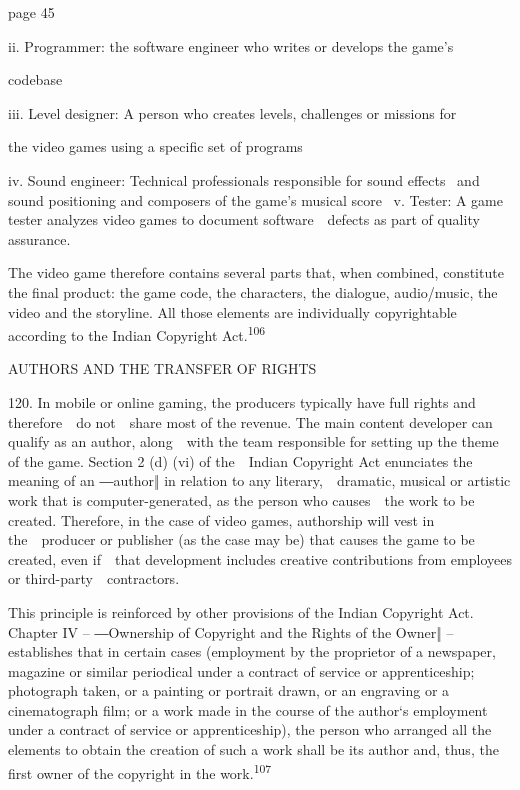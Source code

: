 \documentclass[
]{article}
\begin{document}
{page 45}

{ii. }{Programmer: the software engineer who writes or develops the
g}{ame's}

{codebase}

{iii. }{Level designer: A person who creates levels, challenges or
missions for}

{the video games using a specific set of programs}

{iv. }{Sound engineer: Technical professionals responsible for sound
effects }{~and sound positioning and composers of the game's }{musical
score }{~v. }{Tester: A game tester analyzes video games to document
software~~defects as part of quality assurance.}

{The video game therefore contains several parts that, when combined,
constitute the final product: the game code, the characters, the
dialogue, audio/music, the video and the storyline. All those elements
are individually copyrightable according to the Indian }{Copyright
Act}{.}\textsuperscript{{106}}

{AUTHORS AND THE TRANSFER OF RIGHTS}

{120. }{In mobile or online gaming, the producers typically have full
rights and therefore~~do not~~share most of the revenue. The main
content developer can qualify as an author, along~~with the team
responsible for setting up the theme of the game. Section 2 (d) (vi) of
the~~Indian }{Copyright Act }{enunciates the meaning of an ―}{author}{‖
in }{relation to any literary,~~dramatic, musical or artistic work that
is computer-generated, as the person who causes~~the work to be created.
Therefore, in the case of video games, authorship will vest in
the~~producer or publisher (as the case may be) that causes the game to
be created, even if~~that development includes creative contributions
from employees or third-party~~contractors.}

{This principle is reinforced by other provisions of the Indian
}{Copyright Act}{. Chapter IV }{-- }{―Ownership of Copyright and the
Rights of the Owner‖ }{-- }{establishes that in certain cases
(}{employment by the proprietor of a newspaper, magazine or similar
periodical under a contract of service or apprenticeship; photograph
taken, or a painting or portrait drawn, or an engraving or a
cin}{ematograph film; or a work made in the course of the author`s
}{employment under a contract of service or apprenticeship}{), the
person who arranged all the elements to obtain the creation of such a
work shall be its author and, thus, the first owner of the copyright in
the work.}\textsuperscript{{107}}
\end{document}

